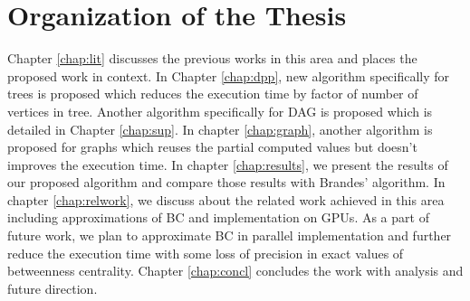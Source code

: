 \vspace{-1.0em}
\section{Organization of the Thesis}
\vspace{-1.0em}
Chapter \ref{chap:lit} discusses the previous works in this area and places the proposed work in context. In Chapter \ref{chap:dpp}, new algorithm specifically for trees is proposed which reduces the execution time by factor of number of vertices in tree. Another algorithm specifically for DAG is proposed which is detailed in Chapter \ref{chap:sup}. In chapter \ref{chap:graph}, another algorithm is proposed for graphs which reuses the partial computed values but doesn't improves the execution time. In chapter \ref{chap:results}, we present the results of our proposed algorithm and compare those results with Brandes' algorithm. In chapter \ref{chap:relwork}, we discuss about the related work achieved in this area including approximations of BC and implementation on GPUs.  As a part of future work, we plan to approximate BC in parallel implementation and further reduce the execution time with some loss of precision in exact values of betweenness centrality. Chapter \ref{chap:concl} concludes the work with analysis and future direction.